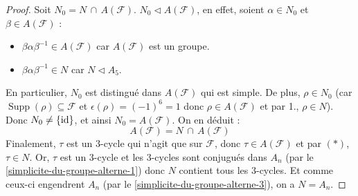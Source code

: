 \begin{proof}
		\newpar
		Soit $N_0 = N \, \cap \, A(\mathcal{F})$. $N_0 \lhd A(\mathcal{F})$, en effet, soient $\alpha \in N_0$ et $\beta \in A(\mathcal{F})$ :
		\begin{itemize}
			\item $\beta \alpha \beta^{-1} \in A(\mathcal{F})$ car $A(\mathcal{F})$ est un groupe.
			\item $\beta \alpha \beta^{-1} \in N$ car $N \lhd A_5$.
		\end{itemize}
		En particulier, $N_0$ est distingué dans $A(\mathcal{F})$ qui est simple. De plus, $\rho \in N_0$ (car $\operatorname{Supp}(\rho) \subseteq \mathcal{F}$ et $\epsilon(\rho) = (-1)^{6} = 1$ donc $\rho \in A(\mathcal{F})$ et par 1., $\rho \in N$). Donc $N_0 \neq \{ \operatorname{id} \}$, et ainsi $N_0 = A(\mathcal{F})$. On en déduit :
		\[ A(\mathcal{F}) = N \, \cap \, A(\mathcal{F}) \tag{$*$} \]
		Finalement, $\tau$ est un $3$-cycle qui n'agit que sur $\mathcal{F}$, donc $\tau \in A(\mathcal{F})$ et par $(*)$, $\tau \in N$. Or, $\tau$ est un $3$-cycle et les $3$-cycles sont conjugués dans $A_n$ (par le \cref{simplicite-du-groupe-alterne-1}) donc $N$ contient tous les $3$-cycles. Et comme ceux-ci engendrent $A_n$ (par le \cref{simplicite-du-groupe-alterne-3}), on a $N = A_n$.
	\end{proof}

